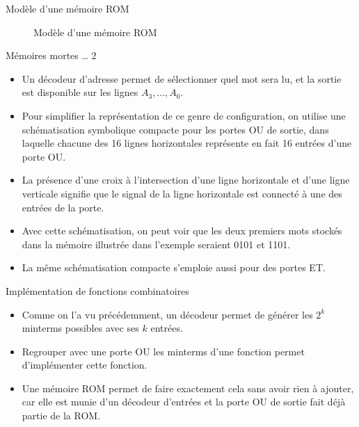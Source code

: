 \documentclass[presentation]{beamer}
\begin{document}
\begin{frame}[label={sec:org74664a6}]{Modèle d'une mémoire ROM}
\begin{figure}[htbp]
\centering

\caption{\label{fig:orgf30d6b0}Modèle d'une mémoire ROM}
\end{figure}
\end{frame}


\begin{frame}[label={sec:org15dbc96}]{Mémoires mortes \ldots{} 2}
\begin{itemize}
\item Un décodeur d'adresse permet de sélectionner quel mot sera lu, et la sortie est disponible sur les lignes \(A_3, \ldots, A_0\).

\item Pour simplifier la représentation de ce genre de configuration, on utilise une schématisation symbolique compacte pour les portes OU de sortie, dans laquelle chacune des 16 lignes horizontales représente en fait 16 entrées d'une porte OU.

\item La présence d'une croix à l'intersection d'une ligne horizontale et d'une ligne verticale signifie que le signal de la ligne horizontale est connecté à une des entrées de la porte.

\item Avec cette schématisation, on peut voir que les deux premiers mots stockés dans la mémoire illustrée dans l'exemple seraient 0101 et 1101.

\item La même schématisation compacte s'emploie aussi pour des portes ET.
\end{itemize}
\end{frame}

\begin{frame}[label={sec:org8081606}]{Implémentation de fonctions combinatoires}
\begin{itemize}
\item Comme on l'a vu précédemment, un décodeur permet de générer les \(2^k\) minterms possibles avec ses \(k\) entrées.

\item Regrouper avec une porte OU les minterms d'une fonction permet d'implémenter cette fonction.

\item Une mémoire ROM permet de faire exactement cela sans avoir rien à ajouter, car elle est munie d'un décodeur d'entrées et la porte OU de sortie fait déjà partie de la ROM.
\end{itemize}
\end{frame}
\end{document}
